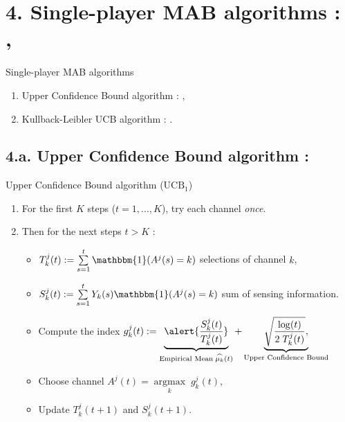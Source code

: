 \documentclass[12pt,english,ignorenonframetext,aspectratio=169,]{beamer}
\providecommand{\tightlist}{%
  \setlength{\itemsep}{0pt}\setlength{\parskip}{0pt}}
\begin{document}
\section{\hfill{}4. Single-player MAB algorithms : \UCB, \klUCB\hfill{}}

\begin{frame}{Single-player MAB algorithms}

\begin{enumerate}
\def\labelenumi{\arabic{enumi}.}
\tightlist
\item
  Upper Confidence Bound algorithm : \UCB,\vspace*{15pt}
\item
  Kullback-Leibler UCB algorithm : \klUCB.
\end{enumerate}

\end{frame}



\subsection{\hfill{}4.a. Upper Confidence Bound algorithm : \UCB\hfill{}}

\begin{frame}{Upper Confidence Bound algorithm (\(\mathrm{UCB}_1\))}

\begin{enumerate}
\def\labelenumi{\arabic{enumi}.}
\tightlist
\item
  For the first \(K\) steps (\(t=1,\dots,K\)), try each channel
  \emph{once}.
\item
  Then for the next steps \(t > K\) :

  \begin{itemize}
  \tightlist
  \item
  \(T_k^j(t) := \sum\limits_{s=1}^{t} \mathbbm{1}(A^j(s) = k)\) selections of channel \(k\),
  \item
  \(S_k^j(t) := \sum\limits_{s=1}^{t} Y_{k}(s) \mathbbm{1}(A^j(s) = k)\) sum of sensing information.
  \item
    Compute the index
    \(g_k^j(t) := \underbrace{\alert{\frac{S_k^j(t)}{T_k^j(t)}}}_{\text{Empirical Mean}\; \widehat{\mu_k}(t)} + \underbrace{\sqrt{\frac{\log(t)}{2 \; T_k^j(t)}},}_{\text{Upper Confidence Bound}}\)
  \item
    Choose channel \(A^j(t) = \mathop{\arg\max}\limits_{k} \; g_k^j(t)\),
  \item
    Update \(T_k^j(t+1)\) and \(S_k^j(t+1)\).
  \end{itemize}
\end{enumerate}


\end{frame}
\end{document}
